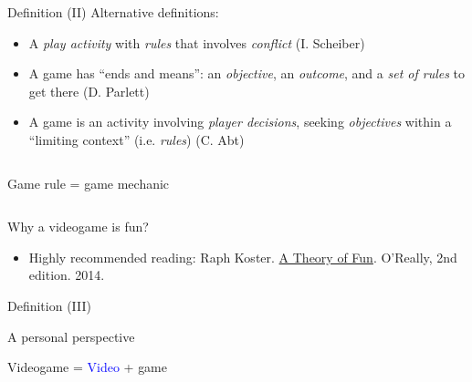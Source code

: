 \documentclass[10pt,compress]{beamer} %
\begin{document}
\begin{frame}{Definition (II)}
	Alternative definitions:

  	\begin{itemize}
	\item A \textit{play activity} with \textit{rules} that involves \textit{conflict} (I. Scheiber)
	\item A game has ``ends and means'': an \textit{objective}, an \textit{outcome}, and a \textit{set of rules} to get there (D. Parlett)
	\item A game is an activity involving \textit{player decisions}, seeking \textit{objectives} within a ``limiting context'' (i.e. \textit{rules}) (C. Abt)
	\end{itemize}

    \begin{columns}
            \begin{block}{}
            Game rule = \alert{game mechanic}
            \end{block}
	\end{columns}

    \bigskip

    Why a videogame is fun?
    \begin{itemize}
	    \item Highly recommended reading: Raph Koster. \href{http://www.theoryoffun.com/theoryoffun.pdf}{A Theory of Fun}. O'Really, 2nd edition. 2014.
	\end{itemize}

\end{frame}

\begin{frame}{Definition (III)}
	\begin{center}
	A personal perspective
	\end{center}

	\begin{center}
	\huge Videogame = \textcolor{blue}{Video} + \alert{game}
	\end{center}

\end{frame}
\end{document}
